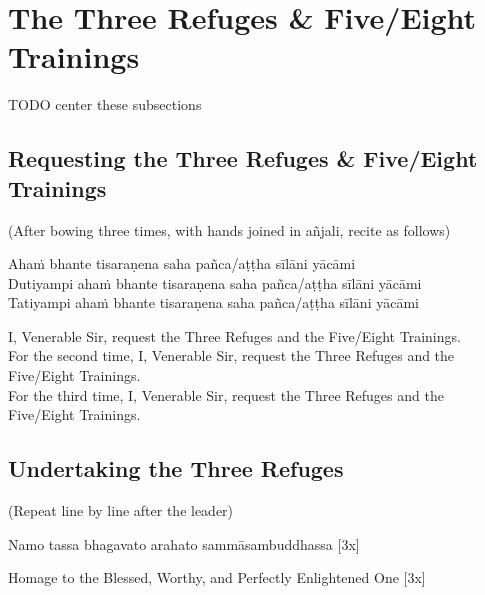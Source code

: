 \section*{The Three Refuges \& Five/Eight Trainings}
TODO center these subsections
\subsection{Requesting the Three Refuges \& Five/Eight Trainings}


\begin{center}
(After bowing three times, with hands joined in añjali, recite as follows)\\
\end{center}

Ahaṁ bhante tisaraṇena saha pañca/aṭṭha sīlāni yācāmi\\
Dutiyampi ahaṁ bhante tisaraṇena saha pañca/aṭṭha sīlāni yācāmi\\
Tatiyampi ahaṁ bhante tisaraṇena saha pañca/aṭṭha sīlāni yācāmi\\

\begin{english}
I, Venerable Sir, request the Three Refuges and the Five/Eight Trainings.\\
For the second time, I, Venerable Sir, request the Three Refuges and the Five/Eight Trainings.\\
For the third time, I, Venerable Sir, request the Three Refuges and the Five/Eight Trainings.
\end{english}

\subsection*{Undertaking the Three Refuges}

\begin{center}
(Repeat line by line after the leader)\\
\end{center}

Namo tassa bhagavato arahato sammāsambuddhassa \hfill{[3x]}\\

\begin{english}
Homage to the Blessed, Worthy, and Perfectly Enlightened One \hfill{[3x]}\\
\end{english}

